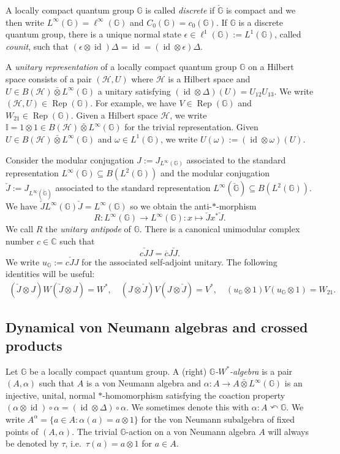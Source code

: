 \documentclass[reqno]{amsart}
\numberwithin{equation}{section}
\DeclareMathOperator{\id}{\mathrm{id}}
\DeclareMathOperator{\Rep}{\mathrm{Rep}}
\newcommand{\G}{\mathbb{G}}
\newcommand{\ovot}{\bar{\otimes}}
\begin{document}
A locally compact quantum group $\G$ is called \emph{discrete} if $\check{\G}$ is compact and we then write $L^\infty(\G)= \ell^\infty(\G)$ and $C_0(\G)= c_0(\G)$. If $\G$ is a discrete quantum group, there is a unique normal state $\epsilon \in \ell^1(\G):= L^1(\G)$, called \emph{counit}, such that 
$(\epsilon \otimes \id)\Delta = \id = (\id \otimes \epsilon)\Delta$.

A \emph{unitary representation} of a locally compact quantum group $\G$ on a Hilbert space consists of a pair $(\mathcal{H}, U)$ where $\mathcal{H}$ is a Hilbert space and $U\in B(\mathcal{H})\ovot L^\infty(\G)$ a unitary satisfying $(\id \otimes \Delta)(U) = U_{12}U_{13}$. We write $(\mathcal{H}, U)\in \Rep(\G)$. For example, we have $V \in \Rep(\G)$ and  $W_{21}\in \Rep(\G)$. Given a Hilbert space $\mathcal{H}$, we write $\mathbb{I}= 1 \otimes 1 \in B(\mathcal{H})\ovot L^\infty(\G)$ for the trivial representation. Given $U \in B(\mathcal{H})\ovot L^\infty(\G)$ and $\omega \in L^1(\G)$, we write $U(\omega):= (\id \otimes \omega)(U)$.

Consider the modular conjugation $J:= J_{L^\infty(\G)}$ associated to the standard representation $L^\infty(\G)\subseteq B(L^2(\G))$ and the modular conjugation $\check{J}:= J_{L^\infty(\check{\G})}$ associated to the standard representation $L^\infty(\check{\G})\subseteq B(L^2(\G))$. We have 
$\check{J}L^\infty(\G)\check{J}=L^\infty(\G)$
so we obtain the anti-$*$-morphism
$$R: L^\infty(\G)\to L^\infty(\G): x \mapsto \check{J}x^*\check{J}.$$
We call $R$ the \emph{unitary antipode} of $\G$. There is a canonical unimodular complex number $c\in \mathbb{C}$ such that 
$$c \check{J}J=\overline{c}J \check{J}.$$
We write $u_\G:= c \check{J} J$ for the associated self-adjoint unitary. The following identities will be useful:
\begin{align*}
    (\check{J}\otimes J)W(\check{J}\otimes J)=W^*, \quad (J\otimes \check{J})V(J\otimes \check{J})=V^*, \quad (u_\G\otimes 1)V(u_\G\otimes 1)=W_{21}.
\end{align*}
\subsection{Dynamical von Neumann algebras and crossed products}
Let $\G$ be a locally compact quantum group.
A (right) \emph{$\G$-$W^*$-algebra} is a pair $(A, \alpha)$ such that $A$ is a von Neumann algebra and $\alpha: A \to A\ovot L^\infty(\G)$ is an injective, unital, normal $*$-homomorphism satisfying the coaction property $(\alpha\otimes \id)\circ \alpha = (\id \otimes \Delta)\circ \alpha$. We sometimes denote this with $\alpha: A\curvearrowleft\G$. We write
$A^{\alpha} = \{a\in A: \alpha(a)= a \otimes 1\}$
for the von Neumann subalgebra of fixed points of $(A, \alpha)$. The trivial $\G$-action on a von Neumann algebra $A$ will always be denoted by $\tau$, i.e.\ $\tau(a)= a \otimes 1$ for $a\in A$. 
\end{document}
